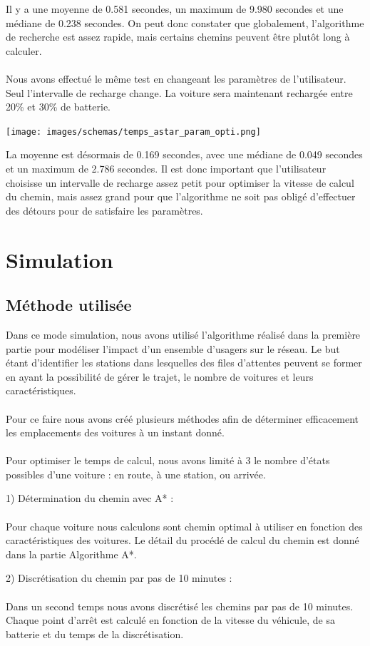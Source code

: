 \documentclass[12pt,titlepage]{report}
\begin{document}
Il y a une moyenne de 0.581 secondes, un maximum de 9.980 secondes et une médiane de 0.238 secondes. On peut donc constater que globalement, l'algorithme de recherche est assez rapide, mais certains chemins peuvent être plutôt long à calculer.
\\\\
Nous avons effectué le même test en changeant les paramètres de l'utilisateur. Seul l'intervalle de recharge change. La voiture sera maintenant rechargée entre 20\% et 30\% de batterie.
\begin{center}\texttt{[image: images/schemas/temps\_astar\_param\_opti.png]}\end{center}
La moyenne est désormais de 0.169 secondes, avec une médiane de 0.049 secondes et un maximum de 2.786 secondes. Il est donc important que l'utilisateur choisisse un intervalle de recharge assez petit pour optimiser la vitesse de calcul du chemin, mais assez grand pour que l'algorithme ne soit pas obligé d'effectuer des détours pour de satisfaire les paramètres.


\section{Simulation}

\subsection{Méthode utilisée}

Dans ce mode simulation, nous avons utilisé l’algorithme réalisé dans la première partie pour modéliser l’impact d’un ensemble d’usagers sur le réseau. Le but étant d’identifier les stations dans lesquelles des files d’attentes peuvent se former en ayant la possibilité de gérer le trajet, le nombre de voitures et leurs caractéristiques.
\\ \\
Pour ce faire nous avons créé plusieurs méthodes afin de déterminer efficacement les emplacements des voitures à un instant donné.
\\ \\
Pour optimiser le temps de calcul, nous avons limité à 3 le nombre d’états possibles d’une voiture : en route, à une station, ou arrivée.
\\ \par
1) Détermination du chemin avec A* :
\\ \\
Pour chaque voiture nous calculons sont chemin optimal à utiliser en fonction des caractéristiques des voitures. Le détail du procédé de calcul du chemin est donné dans la partie Algorithme A*.
\\ \par
2) Discrétisation du chemin par pas de 10 minutes :
\\ \\
Dans un second temps nous avons discrétisé les chemins par pas de 10 minutes. Chaque point d’arrêt est calculé en fonction de la vitesse du véhicule, de sa batterie et du temps de la discrétisation.
\end{document}
